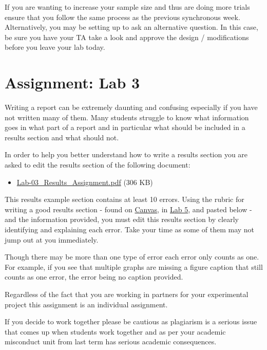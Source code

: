 \documentclass[
]{book}
\providecommand{\tightlist}{%
  \setlength{\itemsep}{0pt}\setlength{\parskip}{0pt}}
\begin{document}
If you are wanting to increase your sample size and thus are doing more trials ensure that you follow the same process as the previous synchronous week. Alternatively, you may be setting up to ask an alternative question. In this case, be sure you have your TA take a look and approve the design / modifications before you leave your lab today.

\hypertarget{assignment-lab-3}{%
\chapter*{Assignment: Lab 3}\label{assignment-lab-3}}

Writing a report can be extremely daunting and confusing especially if you have not written many of them. Many students struggle to know what information goes in what part of a report and in particular what should be included in a results section and what should not.

In order to help you better understand how to write a results section you are asked to edit the results section of the following document:

\begin{itemize}
\tightlist
\item
  \href{files/lab-3_report/Lab-03_Results_Assignment.pdf}{Lab-03\_Results\_Assignment.pdf} (306 KB)
\end{itemize}

This results example section contains at least 10 errors. Using the rubric for writing a good results section - found on \href{https://canvas.ubc.ca}{Canvas}, in \href{05-Lab-5\#rubric.html}{Lab 5}, and pasted below - and the information provided, you must edit this results section by clearly identifying and explaining each error. Take your time as some of them may not jump out at you immediately.

Though there may be more than one type of error each error only counts as one. For example, if you see that multiple graphs are missing a figure caption that still counts as one error, the error being no caption provided.

Regardless of the fact that you are working in partners for your experimental project this assignment is an individual assignment.

If you decide to work together please be cautious as plagiarism is a serious issue that comes up when students work together and as per your academic misconduct unit from last term has serious academic consequences.
\end{document}
